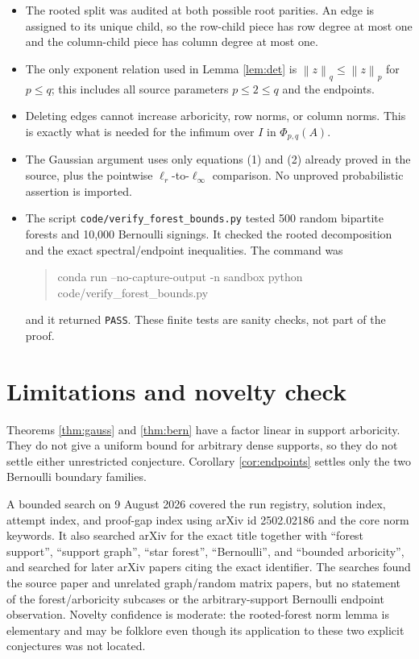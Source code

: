 \documentclass[11pt]{article}
\theoremstyle{definition}
\theoremstyle{remark}
\newcommand{\opnorm}[1]{\left\lVert #1\right\rVert}
\begin{document}
\begin{itemize}
\item The rooted split was audited at both possible root parities.  An edge is
assigned to its unique child, so the row-child piece has row degree at most one
and the column-child piece has column degree at most one.
\item The only exponent relation used in Lemma \ref{lem:det} is
$\opnorm{z}_q\le\opnorm{z}_p$ for $p\le q$; this includes all source parameters
$p\le2\le q$ and the endpoints.
\item Deleting edges cannot increase arboricity, row norms, or column norms.
This is exactly what is needed for the infimum over $I$ in
$\Phi_{p,q}(A)$.
\item The Gaussian argument uses only equations (1) and (2) already proved in
the source, plus the pointwise $\ell_r$-to-$\ell_\infty$ comparison.  No
unproved probabilistic assertion is imported.
\item The script \texttt{code/verify\_forest\_bounds.py} tested 500 random
bipartite forests and 10,000 Bernoulli signings.  It checked the rooted
decomposition and the exact spectral/endpoint inequalities.  The command was
\begin{quote}\small\ttfamily
conda run --no-capture-output -n sandbox python\\
code/verify\_forest\_bounds.py
\end{quote}
and it returned \texttt{PASS}.  These finite tests are sanity checks, not part
of the proof.
\end{itemize}

\section{Limitations and novelty check}

Theorems \ref{thm:gauss} and \ref{thm:bern} have a factor linear in support
arboricity.  They do not give a uniform bound for arbitrary dense supports, so
they do not settle either unrestricted conjecture.  Corollary
\ref{cor:endpoints} settles only the two Bernoulli boundary families.

A bounded search on 9 August 2026 covered the run registry, solution index,
attempt index, and proof-gap index using arXiv id 2502.02186 and the core norm
keywords.  It also searched arXiv for the exact title together with
``forest support'', ``support graph'', ``star forest'', ``Bernoulli'', and
``bounded arboricity'', and searched for later arXiv papers citing the exact
identifier.  The searches found the source paper and unrelated graph/random
matrix papers, but no statement of the forest/arboricity subcases or the
arbitrary-support Bernoulli endpoint observation.  Novelty confidence is
moderate: the rooted-forest norm lemma is elementary and may be folklore even
though its application to these two explicit conjectures was not located.
\end{document}
